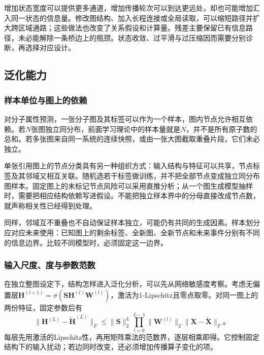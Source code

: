 增加状态宽度可以提供更多通道，增加传播轮次可以到达更远处，却也可能增加汇入同一状态的信息量。修改图结构、加入长程连接或全局读取，可以缩短路径并扩大跨区域通路；这些做法也改变了关系假设和计算量。残差主要保留已有信息路径，未必能解除一条桥边上的瓶颈。状态收敛、过平滑与过压缩因而需要分别诊断，再选择对应设计。

\subsection{泛化能力}
\label{sec:gnn-generalization}

\subsubsection{样本单位与图上的依赖}
\label{sec:gnn-sample-units}

对分子属性预测，一张分子图及其标签可以作为一个样本，图内节点允许相互依赖。若$N$张图独立同分布，前面学习理论中的样本量就是$N$，并不是所有原子数的总和。若多张图来自同一系统的连续快照，或由一张大图截取重叠片段，它们未必独立。

单张引用图上的节点分类具有另一种组织方式：输入结构与特征可以共享，节点标签及其邻域又相互关联。随机选若干标签做训练，并不把全部节点变成独立同分布图样本。固定图上的未标记节点风险可以采用直推分析；从一个图生成模型抽样时，需要把相应结构依赖写进假设。不能把独立样本界中的分母直接改成节点数，就声称相关性已经得到处理。

同样，邻域互不重叠也不自动保证样本独立，可能仍有共同的生成因素。样本划分应对应未来使用：已知图上的剩余标签、全新图、全新节点和未来事件分别有不同的信息边界。比较不同模型时，必须固定这一边界。

\subsubsection{输入尺度、度与参数范数}
\label{sec:gnn-norm-generalization}

在独立整图设定下，结构怎样进入泛化分析，可以先从网络敏感度考察。考虑无偏置层$\bm{H}^{(l+1)}=\sigma(\bm{S}\bm{H}^{(l)}\bm{W}^{(l)})$，激活为1-Lipschitz且零点取零。对同一图上的两份特征，固定参数后有
\begin{equation}
  \lVert\bm{H}^{(L)}-\widetilde{\bm{H}}^{(L)}\rVert_F
    \leq\lVert\bm{S}\rVert_2^L
      \prod_{l=0}^{L-1}\lVert\bm{W}^{(l)}\rVert_2
      \lVert\bm{X}-\widetilde{\bm{X}}\rVert_F\text{。}
  \label{eq:gnn-feature-sensitivity}
\end{equation}
每层先用激活的Lipschitz性，再用矩阵乘法的范数界，逐层相乘即得。它控制固定结构下的输入扰动；若边同时改变，还必须增加传播算子变化的项。

